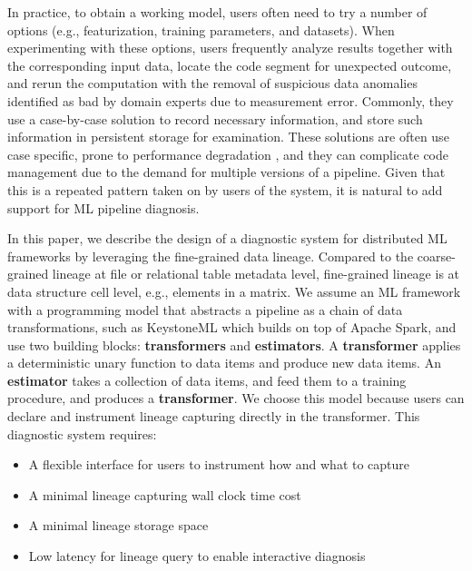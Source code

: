 \documentclass{sig-alternate}
\newenvironment{shortlist}{
        \vspace*{-0.5em}
  \begin{itemize}
  \setlength{\itemsep}{-0.1em}
}{
  \end{itemize}
        \vspace*{-0.5em}
}
\begin{document}
In practice, to obtain a working model, users often need to try a number of options (e.g., featurization, training parameters, and datasets). 
When experimenting with these options, users frequently analyze results together with the corresponding input data,  
locate the code segment for unexpected outcome, and rerun the computation with the removal of suspicious data anomalies
identified as bad by domain experts due to measurement error.
Commonly, they use a case-by-case solution to record necessary information, and store such information in persistent storage for examination.
These solutions are often use case specific, prone to performance degradation , and they can complicate code
management due to the demand for multiple versions of a pipeline.
Given that this is a repeated pattern taken on by users of the system, it is natural to add support 
for ML pipeline diagnosis.

In this paper, we describe the design of a diagnostic system for distributed ML frameworks by leveraging the fine-grained data lineage.
Compared to the coarse-grained lineage at file or relational table metadata level, fine-grained lineage is at data structure cell level, e.g., elements in a matrix. 
We assume an ML framework with a programming model that abstracts a pipeline as a chain of data transformations, such as KeystoneML
which builds on top of Apache Spark, and use two building blocks: {\bf transformers} and {\bf estimators}.
A {\bf transformer} applies a deterministic unary function to data items and produce new data items.
An {\bf estimator} takes a collection of data items, and feed them to a training procedure,  and produces a {\bf transformer}.
We choose this model because users can declare and instrument lineage capturing directly in the transformer.
This diagnostic system requires:
\begin{shortlist}
\item{} A flexible interface for users to instrument how and what to capture
\item{} A minimal lineage capturing wall clock time cost
\item{} A minimal lineage storage space
\item{} Low latency for lineage query to enable interactive diagnosis
\end{shortlist}
\end{document}
